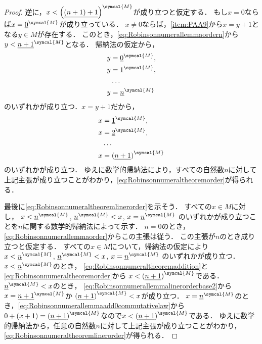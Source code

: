 \begin{proof}
	逆に，\(x < \interpretation{\symcal{M}}{\paren{\numeral{\paren{n + 1} + 1}}}\)が成り立つと仮定する．
	もし\(x = 0\)ならば\(x = \interpretation{\symcal{M}}{\numeral{0}}\)が成り立っている．
	\(x \neq 0\)ならば，\cref{item:PAA9}から\(x = y + 1\)となる\(y \in M\)が存在する．
	このとき，\cref{eq:Robinsonnumerallemmaordern}から\(y < \interpretation{\symcal{M}}{\numeral{n + 1}}\)となる．
	帰納法の仮定から，
	\begin{align*}
		y & = \interpretation{\symcal{M}}{\numeral{0}}, \\
		y & = \interpretation{\symcal{M}}{\numeral{1}}, \\
		  & \dots                                       \\
		y & = \interpretation{\symcal{M}}{\numeral{n}}
	\end{align*}
	のいずれかが成り立つ．\(x = y + 1\)だから，
	\begin{align*}
		x & = \interpretation{\symcal{M}}{\numeral{1}},            \\
		x & = \interpretation{\symcal{M}}{\numeral{2}},            \\
		  & \dots                                                  \\
		x & = \interpretation{\symcal{M}}{\paren{\numeral{n + 1}}}
	\end{align*}
	のいずれかが成り立つ．
	ゆえに数学的帰納法により，すべての自然数\(n\)に対して上記主張が成り立つことがわかり，\cref{eq:Robinsonnumeraltheoremorder}が得られる．

	最後に\cref{eq:Robinsonnumeraltheoremlinerorder}を示そう．
	すべての\(x \in M\)に対し，
	\(x < \interpretation{\symcal{M}}{\numeral{n}}\), \(\interpretation{\symcal{M}}{\numeral{n}} < x\), \(x = \interpretation{\symcal{M}}{\numeral{n}}\)
	のいずれかが成り立つことを\(n\)に関する数学的帰納法によって示す．
	\(n = 0\)のとき，\cref{eq:Robinsonnumerallemmaorder}からこの主張は従う．
	この主張が\(n\)のとき成り立つと仮定する．
	すべての\(x \in M\)について，帰納法の仮定により
	\(x < \interpretation{\symcal{M}}{\numeral{n}}\), \(\interpretation{\symcal{M}}{\numeral{n}} < x\), \(x = \interpretation{\symcal{M}}{\numeral{n}}\)
	のいずれかが成り立つ．
	\(x < \interpretation{\symcal{M}}{\numeral{n}}\)のとき，
	\cref{eq:Robinsonnumeraltheoremaddition}と\cref{eq:Robinsonnumeraltheoremorder}から
	\(x < \interpretation{\symcal{M}}{\paren{\numeral{n + 1}}}\)である．
	\(\interpretation{\symcal{M}}{\numeral{n}} < x\)のとき，
	\cref{eq:Robinsonnumerallemmalinerorderbase2}から\(x = \interpretation{\symcal{M}}{\numeral{n + 1}}\)か
	\(\interpretation{\symcal{M}}{\paren{\numeral{n + 1}}} < x\)が成り立つ．
	\(x = \interpretation{\symcal{M}}{\numeral{n}}\)のとき，\cref{eq:Robinsonnumerallemmaadd0commutativelaw}から
	\(0 + \paren{x + 1} = \interpretation{\symcal{M}}{\paren{\numeral{n + 1}}}\)なので\(x < \interpretation{\symcal{M}}{\paren{\numeral{n + 1}}}\)である．
	ゆえに数学的帰納法から，任意の自然数\(n\)に対して上記主張が成り立つことがわかり，\cref{eq:Robinsonnumeraltheoremlinerorder}が得られる．
\end{proof}


